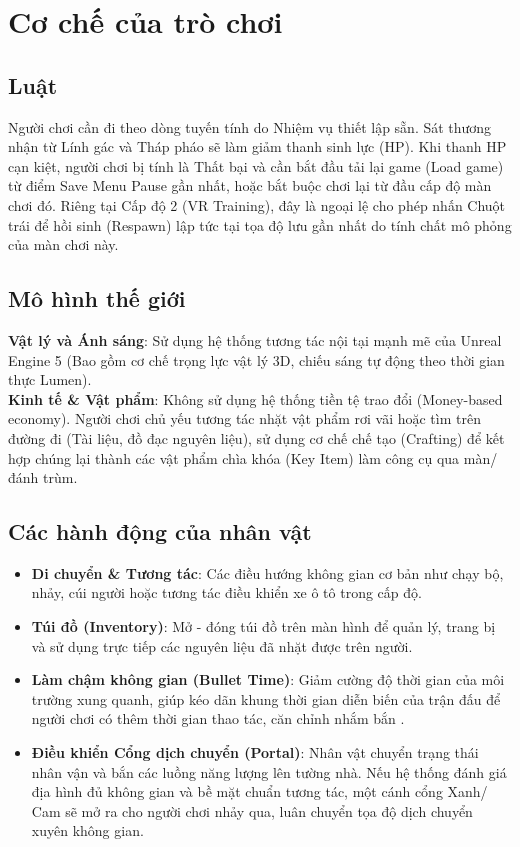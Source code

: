 \documentclass[../DoAn.tex]{subfiles}
\begin{document}
\section{Cơ chế của trò chơi}

\subsection{Luật}
Người chơi cần đi theo dòng tuyến tính do Nhiệm vụ thiết lập sẵn. Sát thương nhận từ Lính gác và Tháp pháo sẽ làm giảm thanh sinh lực (HP). Khi thanh HP cạn kiệt, người chơi bị tính là Thất bại và cần bắt đầu tải lại game (Load game) từ điểm Save Menu Pause gần nhất, hoặc bắt buộc chơi lại từ đầu cấp độ màn chơi đó. Riêng tại Cấp độ 2 (VR Training), đây là ngoại lệ cho phép nhấn Chuột trái để hồi sinh (Respawn) lập tức tại tọa độ lưu gần nhất do tính chất mô phỏng của màn chơi này.

\subsection{Mô hình thế giới}
\textbf{Vật lý và Ánh sáng}: Sử dụng hệ thống tương tác nội tại mạnh mẽ của Unreal Engine 5 (Bao gồm cơ chế trọng lực vật lý 3D, chiếu sáng tự động theo thời gian thực Lumen).
\\
\textbf{Kinh tế \& Vật phẩm}: Không sử dụng hệ thống tiền tệ trao đổi (Money-based economy). Người chơi chủ yếu tương tác nhặt vật phẩm rơi vãi hoặc tìm trên đường đi (Tài liệu, đồ đạc nguyên liệu), sử dụng cơ chế chế tạo (Crafting) để kết hợp chúng lại thành các vật phẩm chìa khóa (Key Item) làm công cụ qua màn/đánh trùm.

\subsection{Các hành động của nhân vật}
\begin{itemize}
    \item \textbf{Di chuyển \& Tương tác}: Các điều hướng không gian cơ bản như chạy bộ, nhảy, cúi người hoặc tương tác điều khiển xe ô tô trong cấp độ.
    \item \textbf{Túi đồ (Inventory)}: Mở - đóng túi đồ trên màn hình để quản lý, trang bị và sử dụng trực tiếp các nguyên liệu đã nhặt được trên người.
    \item \textbf{Làm chậm không gian (Bullet Time)}: Giảm cường độ thời gian của môi trường xung quanh, giúp kéo dãn khung thời gian diễn biến của trận đấu để người chơi có thêm thời gian thao tác, căn chỉnh nhắm bắn .
    \item \textbf{Điều khiển Cổng dịch chuyển (Portal)}: Nhân vật chuyển trạng thái nhân vận và bắn các luồng năng lượng lên tường nhà. Nếu hệ thống đánh giá địa hình đủ không gian và bề mặt chuẩn tương tác, một cánh cổng Xanh/ Cam sẽ mở ra cho người chơi nhảy qua, luân chuyển tọa độ dịch chuyển xuyên không gian.
\end{itemize}
\end{document}
